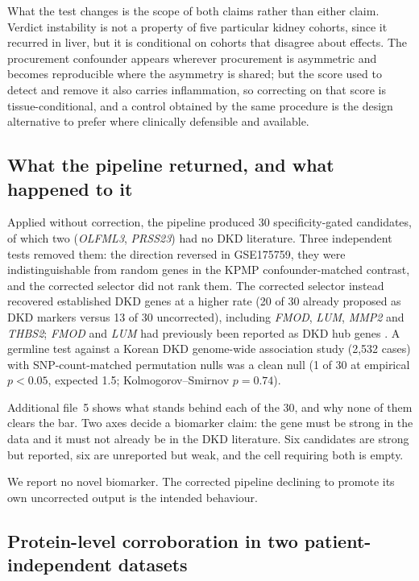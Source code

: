 \documentclass[pdflatex,sn-vancouver-num]{sn-jnl}
\theoremstyle{thmstyleone}
\theoremstyle{thmstyletwo}
\theoremstyle{thmstylethree}
\begin{document}
What the test changes is the scope of both claims rather than either claim. Verdict instability
is not a property of five particular kidney cohorts, since it recurred in liver, but it is
conditional on cohorts that disagree about effects. The procurement confounder appears wherever
procurement is asymmetric and becomes reproducible where the asymmetry is shared; but the score
used to detect and remove it also carries inflammation, so correcting on that score is
tissue-conditional, and a control obtained by the same procedure is the design alternative to
prefer where clinically defensible and available.

\subsection{What the pipeline returned, and what happened to it}\label{sec:candidates}

Applied without correction, the pipeline produced 30 specificity-gated candidates, of which two
(\textit{OLFML3}, \textit{PRSS23}) had no DKD literature. Three independent tests removed them:
the direction reversed in GSE175759, they were indistinguishable from random genes in the KPMP
confounder-matched contrast, and the corrected selector did not rank them. The corrected selector
instead recovered established DKD genes at a higher rate (20 of 30 already proposed as DKD markers
versus 13 of 30 uncorrected), including \textit{FMOD}, \textit{LUM}, \textit{MMP2} and
\textit{THBS2}; \textit{FMOD} and \textit{LUM} had previously been reported as
DKD hub genes \cite{feng2021}. A germline test against a Korean DKD genome-wide association study
(2,532 cases) with SNP-count-matched permutation nulls was a clean null (1 of 30 at empirical
$p < 0.05$, expected 1.5; Kolmogorov--Smirnov $p = 0.74$).

Additional file~5 shows what stands behind each of the 30, and why none
of them clears the bar. Two axes decide a biomarker claim: the gene must be strong in the data
and it must not already be in the DKD literature. Six candidates are strong but reported, six are
unreported but weak, and the cell requiring both is empty.

We report no novel biomarker. The corrected pipeline declining to promote its own uncorrected
output is the intended behaviour.

\subsection{Protein-level corroboration in two patient-independent datasets}\label{sec:proteome}
\end{document}

